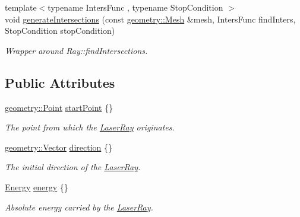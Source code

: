 \begin{DoxyCompactItemize}
{\footnotesize template$<$typename Inters\+Func , typename Stop\+Condition $>$ }\\void \hyperlink{structraytracer_1_1physics_1_1LaserRay_ab54b08958f38711dfd46d49bb2ef583d}{generate\+Intersections} (const \hyperlink{classraytracer_1_1geometry_1_1Mesh}{geometry\+::\+Mesh} \&mesh, Inters\+Func find\+Inters, Stop\+Condition stop\+Condition)
\begin{DoxyCompactList}\small\item\em Wrapper around Ray\+::find\+Intersections. \end{DoxyCompactList}\end{DoxyCompactItemize}
\subsection*{Public Attributes}
\begin{DoxyCompactItemize}
\item 
\hyperlink{classraytracer_1_1geometry_1_1Point}{geometry\+::\+Point} \hyperlink{structraytracer_1_1physics_1_1LaserRay_a7d81914ce19108013d4cd1dcf8c62216}{start\+Point} \{\}
\begin{DoxyCompactList}\small\item\em The point from which the \hyperlink{structraytracer_1_1physics_1_1LaserRay}{Laser\+Ray} originates. \end{DoxyCompactList}\item 
\hyperlink{classraytracer_1_1geometry_1_1Vector}{geometry\+::\+Vector} \hyperlink{structraytracer_1_1physics_1_1LaserRay_a9244628df4215dc86dcbe134c847e54d}{direction} \{\}
\begin{DoxyCompactList}\small\item\em The initial direction of the \hyperlink{structraytracer_1_1physics_1_1LaserRay}{Laser\+Ray}. \end{DoxyCompactList}\item 
\hyperlink{structraytracer_1_1physics_1_1Energy}{Energy} \hyperlink{structraytracer_1_1physics_1_1LaserRay_aed5483243c44e1a7535b249afae7b1ad}{energy} \{\}
\begin{DoxyCompactList}\small\item\em Absolute energy carried by the \hyperlink{structraytracer_1_1physics_1_1LaserRay}{Laser\+Ray}. \end{DoxyCompactList}\item 
\mbox{\label{structraytracer_1_1physics_1_1LaserRay_af0d865a3db62a989276cad5dbd2d28cd}} 

\end{DoxyCompactItemize}
